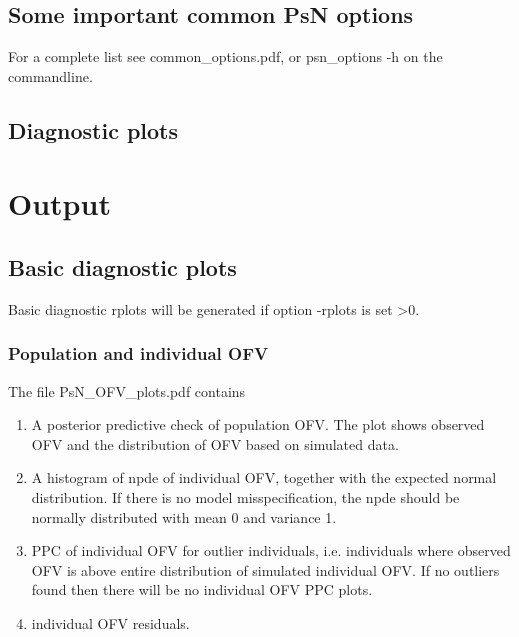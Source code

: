 \subsection{Some important common PsN options}
For a complete list see common\_options.pdf, 
or psn\_options -h on the commandline.


\subsection{Diagnostic plots}
\newcommand{\rplotsconditions}{
See section Output, subsections Basic and Extended diagnostic plots,
for descriptions of the default simeval plots.
The default simeval template 
requires that libraries gridExtra, PEIP and PerformanceAnalytics are installed.
If the conditions are not fulfilled then no pdf will be generated,
see the .Rout file in the main run directory for error messages.}



\section{Output}

\subsection{Basic diagnostic plots}
Basic diagnostic rplots will be generated 
if option -rplots is set >0.

\subsubsection{Population and individual OFV}
\noindent The file PsN\_OFV\_plots.pdf contains
\begin{enumerate}
\item A posterior predictive check of population OFV. The plot shows
observed OFV and the
distribution of OFV based on simulated data.
\item A histogram of npde of individual OFV, together with the expected
normal distribution. If there is no model misspecification, the npde should
be normally distributed with mean 0 and variance 1.
\item PPC of individual OFV for outlier individuals, i.e.
individuals where observed OFV is above entire
distribution of simulated individual OFV. If no outliers found then there will be no individual OFV PPC plots.
\item individual OFV residuals.
\end{enumerate}

